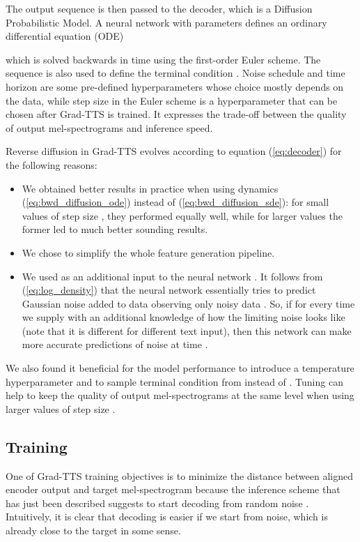 \documentclass{article}
\begin{document}
The output sequence  is then passed to the decoder, which is a Diffusion Probabilistic Model. A neural network  with parameters  defines an ordinary differential equation (ODE)



which is solved backwards in time using the first-order Euler scheme. The sequence  is also used to define the terminal condition . Noise schedule  and time horizon  are some pre-defined hyperparameters whose choice mostly depends on the data, while step size  in the Euler scheme is a hyperparameter that can be chosen after Grad-TTS is trained. It expresses the trade-off between the quality of output mel-spectrograms and inference speed.

Reverse diffusion in Grad-TTS evolves according to equation (\ref{eq:decoder}) for the following reasons:

\begin{itemize}
    \item We obtained better results in practice when using dynamics (\ref{eq:bwd_diffusion_ode}) instead of (\ref{eq:bwd_diffusion_sde}): for small values of step size , they performed equally well, while for larger values the former led to much better sounding results.
    \item We chose  to simplify the whole feature generation pipeline.
    \item We used  as an additional input to the neural network . It follows from (\ref{eq:log_density}) that the neural network  essentially tries to predict Gaussian noise added to data  observing only noisy data . So, if for every time  we supply  with an additional knowledge of how the limiting noise  looks like (note that it is different for different text input), then this network can make more accurate predictions of noise at time .
\end{itemize}

We also found it beneficial for the model performance to introduce a temperature hyperparameter  and to sample terminal condition  from  instead of . Tuning  can help to keep the quality of output mel-spectrograms at the same level when using larger values of step size .

\subsection{Training}
\label{subsec:training}

One of Grad-TTS training objectives is to minimize the distance between aligned encoder output  and target mel-spectrogram  because the inference scheme that has just been described suggests to start decoding from random noise . Intuitively, it is clear that decoding is easier if we start from noise, which is already close to the target  in some sense.
\end{document}
